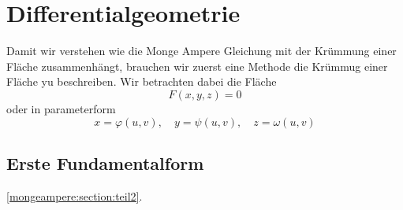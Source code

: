 %
%
%
%
\section{Differentialgeometrie
\label{mongeampere:section:teil1}}
Damit wir verstehen wie die Monge Ampere Gleichung mit der 
Krümmung einer Fläche zusammenhängt, brauchen wir zuerst eine Methode die 
Krümmug einer Fläche yu beschreiben.
Wir betrachten dabei die Fläche
\begin{equation}
  F(x, y, z) = 0
  \label{mongeampere:area}
\end{equation}
oder in parameterform
\begin{equation}
  x = \varphi(u,v), \quad y = \psi(u,v), \quad z = \omega(u,v)
  \label{mongeampere:areaparam}
\end{equation}

\subsection{Erste Fundamentalform
\label{mongeampere:subsection:finibus}}
\ref{mongeampere:section:teil2}.


